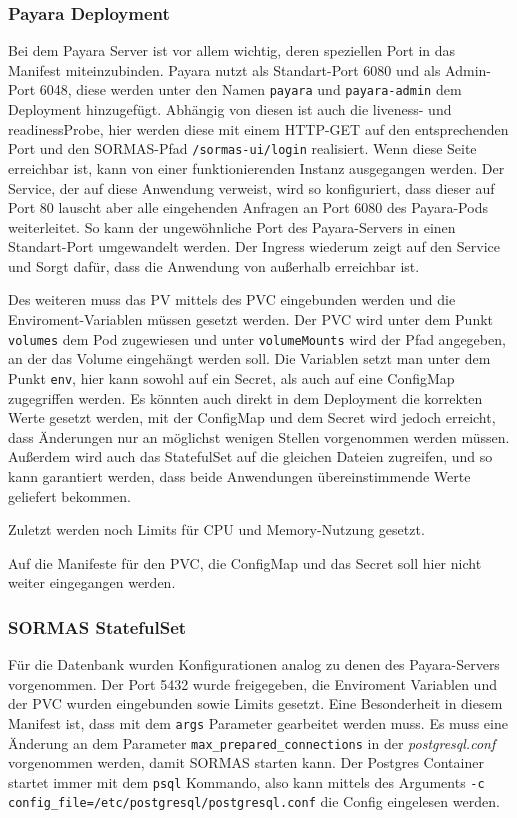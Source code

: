 \hfill \newline
\subsubsection{Payara Deployment}
Bei dem Payara Server ist vor allem wichtig, deren speziellen Port in das Manifest miteinzubinden.
Payara nutzt als Standart-Port 6080 und als Admin-Port 6048, diese werden unter den Namen \texttt{payara} und \texttt{payara-admin} dem Deployment hinzugefügt.
Abhängig von diesen ist auch die liveness- und readinessProbe, hier werden diese mit einem \ac{HTTP}-GET auf den entsprechenden Port und den \ac{SORMAS}-Pfad \texttt{/sormas-ui/login} realisiert.
Wenn diese Seite erreichbar ist, kann von einer funktionierenden Instanz ausgegangen werden.
Der Service, der auf diese Anwendung verweist, wird so konfiguriert, dass dieser auf Port 80 lauscht aber alle eingehenden Anfragen an Port 6080 des Payara-Pods weiterleitet.
So kann der ungewöhnliche Port des Payara-Servers in einen Standart-Port umgewandelt werden. 
Der Ingress wiederum zeigt auf den Service und Sorgt dafür, dass die Anwendung von außerhalb erreichbar ist.

Des weiteren muss das \ac{PV} mittels des \ac{PVC} eingebunden werden und die Enviroment-Variablen müssen gesetzt werden. 
Der \ac{PVC} wird unter dem Punkt \texttt{volumes} dem Pod zugewiesen und unter \texttt{volumeMounts} wird der Pfad angegeben, an der das Volume eingehängt werden soll. 
Die Variablen setzt man unter dem Punkt \texttt{env}, hier kann sowohl auf ein Secret, als auch auf eine ConfigMap zugegriffen werden.
Es könnten auch direkt in dem Deployment die korrekten Werte gesetzt werden, mit der ConfigMap und dem Secret wird jedoch erreicht, dass Änderungen nur an möglichst wenigen Stellen vorgenommen werden müssen.
Außerdem wird auch das StatefulSet auf die gleichen Dateien zugreifen, und so kann garantiert werden, dass beide Anwendungen übereinstimmende Werte geliefert bekommen.

Zuletzt werden noch Limits für \ac{CPU} und Memory-Nutzung gesetzt. 

Auf die Manifeste für den \ac{PVC}, die ConfigMap und das Secret soll hier nicht weiter eingegangen werden. 

\subsubsection{SORMAS StatefulSet}
Für die Datenbank wurden Konfigurationen analog zu denen des Payara-Servers vorgenommen.
Der Port 5432 wurde freigegeben, die Enviroment Variablen und der \ac{PVC} wurden eingebunden sowie Limits gesetzt.
Eine Besonderheit in diesem Manifest ist, dass mit dem \texttt{args} Parameter gearbeitet werden muss. 
Es muss eine Änderung an dem Parameter \texttt{max\_prepared\_connections} in der \textit{postgresql.conf} vorgenommen werden, damit \ac{SORMAS} starten kann. 
Der Postgres Container startet immer mit dem \texttt{psql} Kommando, also kann mittels des Arguments \newline
\texttt{-c config\_file=/etc/postgresql/postgresql.conf} die Config eingelesen werden.

